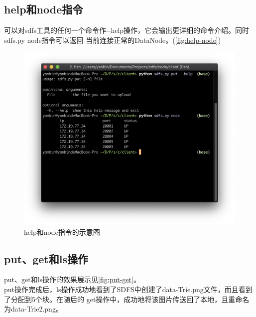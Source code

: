 \documentclass[a4paper]{article}
\begin{document}
\subsection{help和node指令}
可以对sdfs工具的任何一个命令作-{}-help操作，它会输出更详细的命令介绍。同时sdfs.py node指令可以返回
当前连接正常的DataNode。(\autoref{fig:help-node})
\begin{figure}[!hbt]
    \begin{center}
    \includegraphics[scale=0.6]{assets/help-node.png}
    \caption{help和node指令的示意图\label{fig:help-node}} 
    \end{center} 
\end{figure} 


\subsection{put、get和ls操作}
put、get和ls操作的效果展示见\autoref{fig:put-get}。\\

put操作完成后，ls操作成功地看到了SDFS中创建了data-Trie.png文件，而且看到了分配到5个块。在随后的
get操作中，成功地将该图片传送回了本地，且重命名为data-Trie2.png。\\
\end{document}
